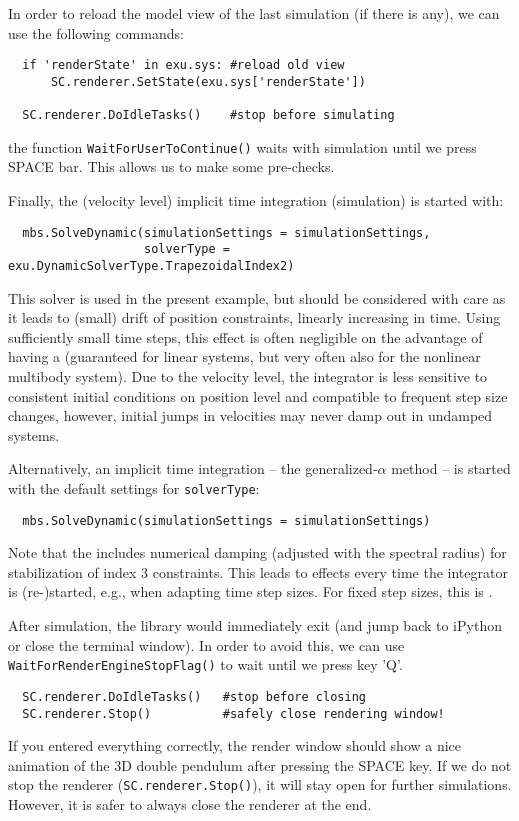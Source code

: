 \noindent In order to reload the model view of the last simulation (if there is any), we can use the following commands:
\pythonstyle\begin{lstlisting}
  if 'renderState' in exu.sys: #reload old view
      SC.renderer.SetState(exu.sys['renderState'])

  SC.renderer.DoIdleTasks()    #stop before simulating
\end{lstlisting}
the function \texttt{WaitForUserToContinue()} waits with simulation until we press SPACE bar. This allows us to make some pre-checks.

\noindent Finally, the  (velocity level) implicit time integration (simulation) is started with:
\pythonstyle\begin{lstlisting}
  mbs.SolveDynamic(simulationSettings = simulationSettings,
                   solverType = exu.DynamicSolverType.TrapezoidalIndex2)
\end{lstlisting}
This solver is used in the present example, but should be considered with care as it leads to (small) drift of position constraints, linearly increasing in time. Using sufficiently small time steps, this effect is often negligible on the advantage of having a  (guaranteed for linear systems, but very often also for the nonlinear multibody system). Due to the velocity level, the integrator is less sensitive to consistent initial conditions on position level and compatible to frequent step size changes, however, initial jumps in velocities may never damp out in undamped systems.

\noindent Alternatively, an  implicit time integration -- the generalized-$\alpha$ method -- is started with the default settings for \texttt{solverType}:
\pythonstyle\begin{lstlisting}
  mbs.SolveDynamic(simulationSettings = simulationSettings)
\end{lstlisting}
Note that the  includes numerical damping (adjusted with the spectral radius) for stabilization of index 3 constraints. This leads to effects every time the integrator is (re-)started, e.g., when adapting time step sizes. For fixed step sizes, this is .

\noindent After simulation, the library would immediately exit (and jump back to iPython or close the terminal window). In order to avoid this, we can use \texttt{WaitForRenderEngineStopFlag()} to wait until we press key 'Q'.
\pythonstyle\begin{lstlisting}
  SC.renderer.DoIdleTasks()   #stop before closing
  SC.renderer.Stop()          #safely close rendering window!
\end{lstlisting}
If you entered everything correctly, the render window should show a nice animation of the 3D double pendulum after pressing the SPACE key. 
If we do not stop the renderer (\texttt{SC.renderer.Stop()}), it will stay open for further simulations. However, it is safer to always close the renderer at the end.

